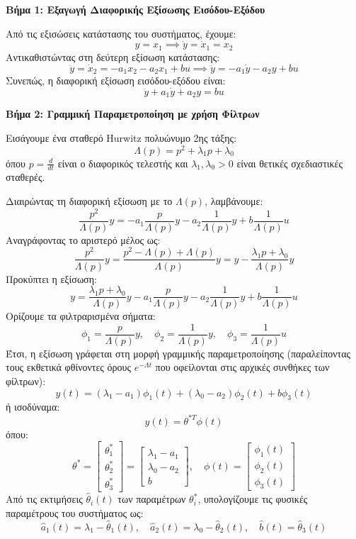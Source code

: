 \documentclass[a4paper,11pt]{article}
\begin{document}
\begin{answer}
\textbf{Βήμα 1: Εξαγωγή Διαφορικής Εξίσωσης Εισόδου-Εξόδου}

Από τις εξισώσεις κατάστασης του συστήματος, έχουμε:
\[ y = x_1 \implies \dot{y} = \dot{x}_1 = x_2 \]
Αντικαθιστώντας στη δεύτερη εξίσωση κατάστασης:
\[ \ddot{y} = \dot{x}_2 = -a_1 x_2 - a_2 x_1 + b u \implies \ddot{y} = -a_1 \dot{y} - a_2 y + b u \]
Συνεπώς, η διαφορική εξίσωση εισόδου-εξόδου είναι:
\[ \ddot{y} + a_1 \dot{y} + a_2 y = b u \]

\textbf{Βήμα 2: Γραμμική Παραμετροποίηση με χρήση Φίλτρων}

Εισάγουμε ένα σταθερό Hurwitz πολυώνυμο 2ης τάξης:
\[ \Lambda(p) = p^2 + \lambda_1 p + \lambda_0 \]
όπου $p = \frac{d}{dt}$ είναι ο διαφορικός τελεστής και $\lambda_1, \lambda_0 > 0$ είναι θετικές σχεδιαστικές σταθερές.

Διαιρώντας τη διαφορική εξίσωση με το $\Lambda(p)$, λαμβάνουμε:
\[ \frac{p^2}{\Lambda(p)} y = -a_1 \frac{p}{\Lambda(p)} y - a_2 \frac{1}{\Lambda(p)} y + b \frac{1}{\Lambda(p)} u \]
Αναγράφοντας το αριστερό μέλος ως:
\[ \frac{p^2}{\Lambda(p)} y = \frac{p^2 - \Lambda(p) + \Lambda(p)}{\Lambda(p)} y = y - \frac{\lambda_1 p + \lambda_0}{\Lambda(p)} y \]
Προκύπτει η εξίσωση:
\[ y = \frac{\lambda_1 p + \lambda_0}{\Lambda(p)} y - a_1 \frac{p}{\Lambda(p)} y - a_2 \frac{1}{\Lambda(p)} y + b \frac{1}{\Lambda(p)} u \]
Ορίζουμε τα φιλτραρισμένα σήματα:
\[ \phi_1 = \frac{p}{\Lambda(p)} y, \quad \phi_2 = \frac{1}{\Lambda(p)} y, \quad \phi_3 = \frac{1}{\Lambda(p)} u \]
Έτσι, η εξίσωση γράφεται στη μορφή γραμμικής παραμετροποίησης (παραλείποντας τους εκθετικά φθίνοντες όρους $e^{-\Lambda t}$ που οφείλονται στις αρχικές συνθήκες των φίλτρων):
\[ y(t) = (\lambda_1 - a_1) \phi_1(t) + (\lambda_0 - a_2) \phi_2(t) + b \phi_3(t) \]
ή ισοδύναμα:
\[ y(t) = \theta^{*T} \phi(t) \]
όπου:
\[ \theta^* = \begin{bmatrix} \theta_1^* \\ \theta_2^* \\ \theta_3^* \end{bmatrix} = \begin{bmatrix} \lambda_1 - a_1 \\ \lambda_0 - a_2 \\ b \end{bmatrix}, \quad \phi(t) = \begin{bmatrix} \phi_1(t) \\ \phi_2(t) \\ \phi_3(t) \end{bmatrix} \]
Από τις εκτιμήσεις $\hat{\theta}_i(t)$ των παραμέτρων $\theta_i^*$, υπολογίζουμε τις φυσικές παραμέτρους του συστήματος ως:
\[ \hat{a}_1(t) = \lambda_1 - \hat{\theta}_1(t), \quad \hat{a}_2(t) = \lambda_0 - \hat{\theta}_2(t), \quad \hat{b}(t) = \hat{\theta}_3(t) \]


\end{answer}
\end{document}
